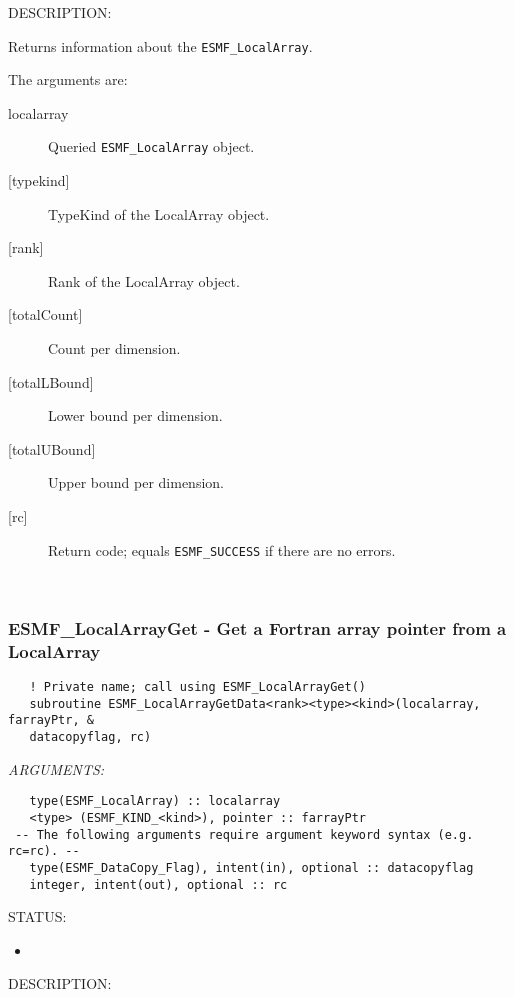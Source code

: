 {\sf DESCRIPTION:\\ }


   Returns information about the {\tt ESMF\_LocalArray}.
  
   The arguments are:
   \begin{description}
   \item[localarray]
   Queried {\tt ESMF\_LocalArray} object.
   \item[{[typekind]}]
   TypeKind of the LocalArray object.
   \item[{[rank]}]
   Rank of the LocalArray object.
   \item[{[totalCount]}]
   Count per dimension.
   \item[{[totalLBound]}]
   Lower bound per dimension.
   \item[{[totalUBound]}]
   Upper bound per dimension.
   \item[{[rc]}]
   Return code; equals {\tt ESMF\_SUCCESS} if there are no errors.
   \end{description}
   
 
\mbox{}\hrulefill\ 
 
\subsubsection [ESMF\_LocalArrayGet] {ESMF\_LocalArrayGet - Get a Fortran array pointer from a LocalArray }


   
\begin{verbatim}   ! Private name; call using ESMF_LocalArrayGet() 
   subroutine ESMF_LocalArrayGetData<rank><type><kind>(localarray, farrayPtr, & 
   datacopyflag, rc) 
   \end{verbatim}{\em ARGUMENTS:}
\begin{verbatim}   type(ESMF_LocalArray) :: localarray 
   <type> (ESMF_KIND_<kind>), pointer :: farrayPtr 
 -- The following arguments require argument keyword syntax (e.g. rc=rc). --
   type(ESMF_DataCopy_Flag), intent(in), optional :: datacopyflag 
   integer, intent(out), optional :: rc 
   \end{verbatim}
{\sf STATUS:}
   \begin{itemize} 
   \item{} 
   \end{itemize} 
   
{\sf DESCRIPTION:\\ }

